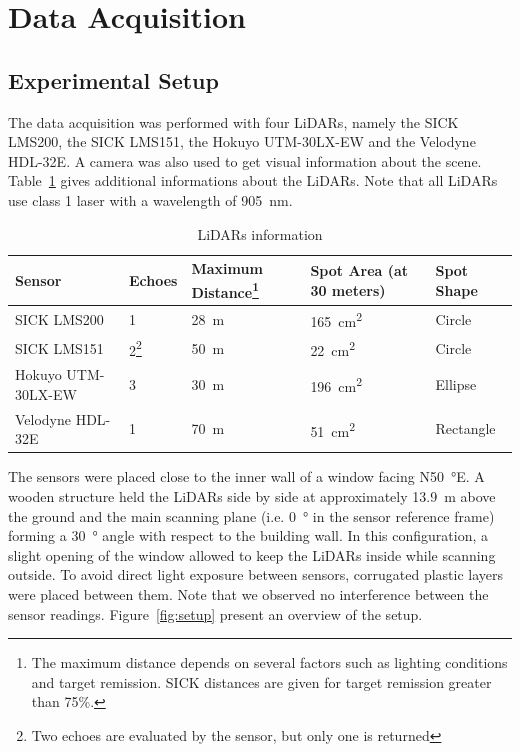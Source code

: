 \section{Data Acquisition}

\subsection{Experimental Setup}
The data acquisition was performed with four LiDARs, namely the SICK LMS200, the SICK LMS151, the Hokuyo UTM-30LX-EW and the Velodyne HDL-32E. A camera was also used to get visual information about the scene. Table~\ref{tab:lidars} gives additional informations about the LiDARs. Note that all LiDARs use class 1 laser with a wavelength of \SI{905}{\nano\meter}.
~\cite{VelodyneManual}
~\cite{UTMDatasheet}
~\cite{LMS151Datasheet}
~\cite{LMS200Manual}

\begin{table}[htbp]
    \centering
    \begin{tabularx}{\linewidth}{|X|X|X|X|X|}\hline
        \textbf{Sensor}             & \textbf{Echoes}  & \textbf{Maximum Distance}\footnote{The maximum distance depends on several factors such as lighting conditions and target remission. SICK distances are given for target remission greater than 75\%.}  & \textbf{Spot Area (at 30 meters)} & \textbf{Spot Shape}  \\ \hline
        SICK LMS200        & 1       & \SI{28}{\meter}   & \SI{165}{\centi\meter\squared}     & Circle     \\ \hline
        SICK LMS151        & 2\footnote{Two echoes are evaluated by the sensor, but only one is returned}       & \SI{50}{\meter}   & \SI{22}{\centi\meter\squared}      & Circle     \\ \hline
        Hokuyo UTM-30LX-EW & 3       & \SI{30}{\meter}   & \SI{196}{\centi\meter\squared}     & Ellipse    \\ \hline
        Velodyne HDL-32E   & 1       & \SI{70}{\meter}   & \SI{51}{\centi\meter\squared}      & Rectangle  \\ \hline
    \end{tabularx}
    \caption{LiDARs information}\label{tab:lidars}
\end{table}

The sensors were placed close to the inner wall of a window facing N\SI{50}{\degree}E. A wooden structure held the LiDARs side by side at approximately \SI{13.9}{\meter} above the ground and the main scanning plane (i.e. \SI{0}{\degree} in the sensor reference frame) forming a \SI{30}{\degree} angle with respect to the building wall. In this configuration, a slight opening of the window allowed to keep the LiDARs inside while scanning outside. To avoid direct light exposure between sensors, corrugated plastic layers were placed between them. Note that we observed no interference between the sensor readings. Figure~\ref{fig:setup} present an overview of the setup.

